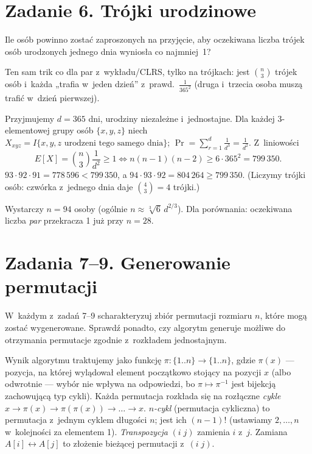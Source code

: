 \documentclass[11pt]{article}
\begin{document}
\section{Zadanie 6. Trójki urodzinowe}
\begin{tresc}
Ile osób powinno zostać zaproszonych na przyjęcie, aby oczekiwana liczba
trójek osób urodzonych jednego dnia wyniosła co najmniej~1?
\end{tresc}

\begin{intuicja}
Ten sam trik co dla par z~wykładu/CLRS, tylko na trójkach: jest $\binom n3$
trójek osób i~każda „trafia w~jeden dzień” z~prawd.\ $\frac1{365^2}$ (druga i~trzecia
osoba muszą trafić w~dzień pierwszej).
\end{intuicja}
\formalnie
Przyjmujemy $d=365$ dni, urodziny niezależne i~jednostajne. Dla każdej
3-elementowej grupy osób $\{x,y,z\}$ niech
$X_{xyz}=I\{\text{$x,y,z$ urodzeni tego samego dnia}\}$;
$\Pr=\sum_{r=1}^{d}\frac1{d^3}=\frac1{d^2}$. Z~liniowości
\[
E[X]=\binom n3\frac1{d^2}\ge1\iff n(n-1)(n-2)\ge6\cdot365^2=799\,350.
\]
$93\cdot92\cdot91=778\,596<799\,350$, a $94\cdot93\cdot92=804\,264\ge799\,350$.
(Liczymy trójki osób: czwórka z~jednego dnia daje $\binom43=4$ trójki.)
\begin{odpowiedz}
Wystarczy $n=94$ osoby (ogólnie $n\approx\sqrt[3]{6}\,d^{2/3}$). Dla porównania:
oczekiwana liczba \emph{par} przekracza 1 już przy $n=28$.
\end{odpowiedz}

\section{Zadania 7--9. Generowanie permutacji}
\begin{tresc}
W~każdym z~zadań 7--9 scharakteryzuj zbiór permutacji rozmiaru $n$, które
mogą zostać wygenerowane. Sprawdź ponadto, czy algorytm generuje możliwe do
otrzymania permutacje zgodnie z~rozkładem jednostajnym.
\end{tresc}

\begin{teoria}
Wynik algorytmu traktujemy jako funkcję $\pi\colon\{1..n\}\to\{1..n\}$, gdzie
$\pi(x)$ --- pozycja, na której wylądował element początkowo stojący na
pozycji $x$ (albo odwrotnie --- wybór nie wpływa na odpowiedzi, bo
$\pi\mapsto\pi^{-1}$ jest bijekcją zachowującą typ cykli). Każda permutacja
rozkłada się na rozłączne \emph{cykle} $x\to\pi(x)\to\pi(\pi(x))\to\dots\to x$.
\emph{$n$-cykl} (permutacja cykliczna) to permutacja z~jednym cyklem długości $n$;
jest ich $(n-1)!$ (ustawiamy $2,\dots,n$ w~kolejności za elementem 1).
\emph{Transpozycja} $(i\;j)$ zamienia $i$ z~$j$. Zamiana $A[i]\leftrightarrow A[j]$
to złożenie bieżącej permutacji z~$(i\;j)$.
\end{teoria}
\end{document}
